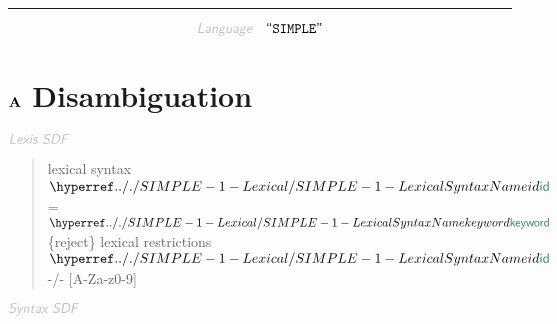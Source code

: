 

\begin{center}
\rule{3in}{0.4pt}
\end{center}

\begin{displaymath}
\KEY{Language} \quad \STRING{SIMPLE}
\end{displaymath}

\section{$\SECT{A}$ Disambiguation}\hypertarget{SectionNumber:A}{}\label{SectionNumber:A}

$\KEY{Lexis SDF}$

\begin{quote}
lexical syntax \newline
     $\SHADE{\SYNHYPER{../.}{SIMPLE-1-Lexical}{id}}$ = $\SHADE{\SYNHYPER{../.}{SIMPLE-1-Lexical}{keyword}}$ \{reject\}\newline
   \newline
   lexical restrictions\newline
     $\SHADE{\SYNHYPER{../.}{SIMPLE-1-Lexical}{id}}$ -/- {[}A-Za-z0-9{]}
\end{quote}

$\KEY{Syntax SDF}$

